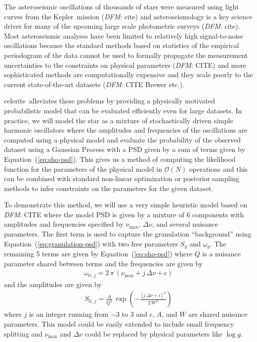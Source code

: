 \documentclass[manuscript, letterpaper]{aastex6}
\makeatletter
\let\origsection\section
\renewcommand\section{\@ifstar{\starsection}{\nostarsection}}
\newcommand\nostarsection[1]{\sectionprelude\origsection{#1}}
\newcommand\starsection[1]{\sectionprelude\origsection*{#1}}
\newcommand\sectionprelude{\vspace{1em}}
\let\origsubsection\subsection
\renewcommand\subsection{\@ifstar{\starsubsection}{\nostarsubsection}}
\newcommand\nostarsubsection[1]{\subsectionprelude\origsubsection{#1}}
\newcommand\starsubsection[1]{\subsectionprelude\origsubsection*{#1}}
\newcommand\subsectionprelude{\vspace{1em}}
\newcommand{\project}[1]{\textsf{#1}}
\newcommand{\kepler}{\project{Kepler}}
\newcommand{\celerite}{\project{celerite}}
\renewcommand{\eqref}[1]{\ref{eq:#1}}
\newcommand{\Eq}[1]{Equation~(\eqref{#1})}
\newcommand{\eq}[1]{\Eq{#1}}
\newcommand{\todo}[3]{{\color{#2}\emph{#1}: #3}}
\newcommand{\dfmtodo}[1]{\todo{DFM}{red}{#1}}
\makeatother
\begin{document}
\section{Examples with real data}

\subsection{Asteroseismic oscillations}

The asteroseismic oscillations of thousands of stars were measured using light
curves from the \kepler\ mission (\dfmtodo{cite}) and asteroseismology is a
key science driver for many of the upcoming large scale photometric surveys
(\dfmtodo{cite}).
Most asteroseismic analyses have been limited to relatively high
signal-to-noise oscillations because the standard methods based on statistics
of the empirical periodogram of the data cannot be used to formally propagate
the measurement uncertainties to the constraints on physical parameters
(\dfmtodo{CITE}) and more sophisticated methods are computationally expensive
and they scale poorly to the current state-of-the-art datasets (\dfmtodo{CITE
Brewer etc.}).

\celerite\ alleviates these problems by providing a physically motivated
probabilistic model that can be evaluated efficiently even for large datasets.
In practice, we will model the star as a mixture of stochastically driven
simple harmonic oscillators where the amplitudes and frequencies of the
oscillations are computed using a physical model and evaluate the probability
of the observed dataset using a Gaussian Process with a PSD given by a sum of
terms given by \eq{sho-psd}.
This gives us a method of computing the likelihood function for the parameters
of the physical model in $\mathcal{O}(N)$ operations and this can be combined
with standard non-linear optimization or posterior sampling methods to infer
constraints on the parameters for the given dataset.

To demonstrate this method, we will use a very simple heuristic model based on
\dfmtodo{CITE} where the model PSD is given by a mixture of 6 components with
amplitudes and frequencies specified by $\nu_\mathrm{max}$, $\Delta \nu$, and
several nuisance parameters.
The first term is used to capture the granulation ``background'' using
\eq{granulation-psd} with two free parameters $S_g$ and $\omega_g$.
The remaining 5 terms are given by \eq{sho-psd} where $Q$ is a nuisance
parameter shared between terms and the frequencies are given by
\begin{eqnarray}
\omega_{0,\,j} = 2\,\pi\,(\nu_\mathrm{max} + j\,\Delta\nu + \epsilon)
\end{eqnarray}
and the amplitudes are given by
\begin{eqnarray}
S_{0,\,j} =
    \frac{A}{Q^2}\,\exp\left(-\frac{[j\,\Delta\nu + \epsilon]^2}{2\,W^2}\right)
\end{eqnarray}
where $j$ is an integer running from $-3$ to 3 and $\epsilon$, $A$, and $W$
are shared nuisance parameters.
This model could be easily extended to include small frequency splitting and
$\nu_\mathrm{max}$ and $\Delta \nu$ could be replaced by physical parameters
like $\log g$.
\end{document}
